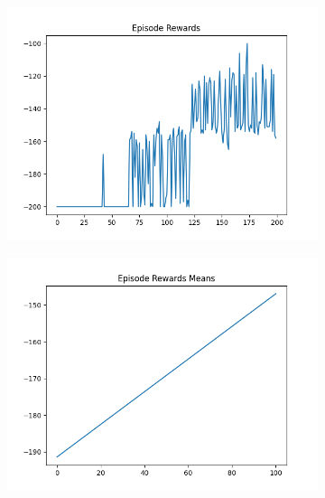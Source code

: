 \begin{figure}[H]
\begin{subfigure}{.47\linewidth}
        \includegraphics[width=\textwidth]{mountain/2024-06-15_13-48-51_dqn_mountaincar_episode_rewards.png}
    \end{subfigure}
    \begin{subfigure}{.47\linewidth}
        \centering
        \includegraphics[width=\textwidth]{mountain/2024-06-15_13-48-51_dqn_mountaincar_episode_rewards_means.png}
    \end{subfigure}
\end{figure}
